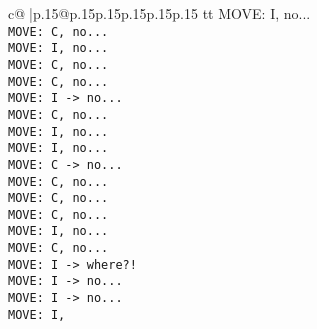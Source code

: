 \documentclass{article}
\begin{document}
{\begin{supertabular}{c@{$\;$}|p{.15\linewidth}@{}p{.15\linewidth}p{.15\linewidth}p{.15\linewidth}p{.15\linewidth}p{.15\linewidth}}
{{{tt  MOVE: I, no...\\ \tt  MOVE: C, no...\\ \tt  MOVE: I, no...\\ \tt  MOVE: C, no...\\ \tt  MOVE: C, no...\\ \tt  MOVE: I -> no...\\ \tt  MOVE: C, no...\\ \tt  MOVE: I, no...\\ \tt  MOVE: I, no...\\ \tt  MOVE: C -> no...\\ \tt  MOVE: C, no...\\ \tt  MOVE: C, no...\\ \tt  MOVE: C, no...\\ \tt  MOVE: I, no...\\ \tt  MOVE: C, no...\\ \tt  MOVE: I -> where?!\\ \tt  MOVE: I -> no...\\ \tt  MOVE: I -> no...\\ \tt  MOVE: I, }}}
\end{supertabular}}
\end{document}
